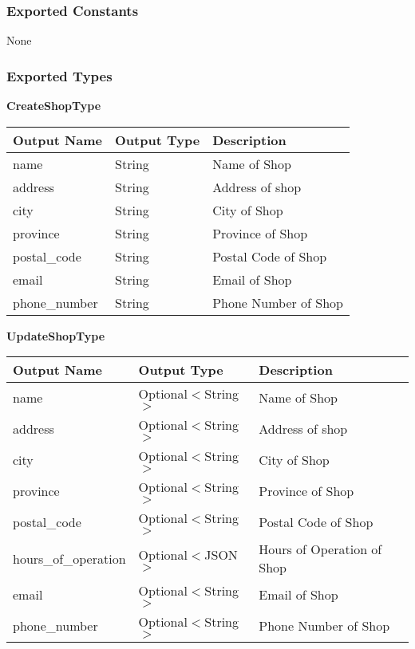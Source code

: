 \documentclass[12pt, titlepage]{article}
\begin{document}
\subsubsection{Exported Constants}

None

\subsubsection{Exported Types}

\textbf{CreateShopType}

\begin{table}[H]
	\begin{tabular}{|l|l|l|}
		\hline
		\textbf{Output Name} & \textbf{Output Type} & \textbf{Description} \\
		\hline
		name                 & String               & Name of Shop         \\
		\hline
		address              & String               & Address of shop      \\
		\hline
		city                 & String               & City of Shop         \\
		\hline
		province             & String               & Province of Shop     \\
		\hline
		postal\_code         & String               & Postal Code of Shop  \\
		\hline
		email                & String               & Email of Shop        \\
		\hline
		phone\_number        & String               & Phone Number of Shop \\
		\hline
	\end{tabular}
\end{table}

\textbf{UpdateShopType}

\begin{table}[H]
	\begin{tabular}{|l|l|l|}
		\hline
		\textbf{Output Name} & \textbf{Output Type} & \textbf{Description}       \\
		\hline
		name                 & Optional$<$String$>$ & Name of Shop               \\
		\hline
		address              & Optional$<$String$>$ & Address of shop            \\
		\hline
		city                 & Optional$<$String$>$ & City of Shop               \\
		\hline
		province             & Optional$<$String$>$ & Province of Shop           \\
		\hline
		postal\_code         & Optional$<$String$>$ & Postal Code of Shop        \\
		\hline
		hours\_of\_operation & Optional$<$JSON$>$   & Hours of Operation of Shop \\
		\hline
		email                & Optional$<$String$>$ & Email of Shop              \\
		\hline
		phone\_number        & Optional$<$String$>$ & Phone Number of Shop       \\
		\hline
	\end{tabular}
\end{table}
\end{document}
